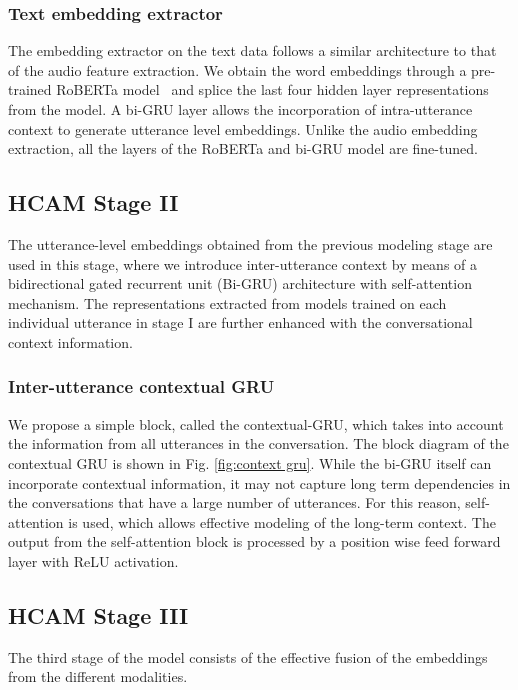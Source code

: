 \documentclass[lettersize,journal]{IEEEtran}
\begin{document}
\subsubsection{Text embedding extractor}\label{textfeat}
The embedding extractor on the text data follows a similar architecture to that of the audio feature extraction. We obtain the word embeddings through a pre-trained RoBERTa model~\cite{liu2019roberta} and splice the last four hidden layer representations from the model. A bi-GRU layer allows the incorporation of intra-utterance context to generate utterance level embeddings.  Unlike the audio embedding  extraction, all the layers of the RoBERTa and bi-GRU model are fine-tuned. 
\subsection{HCAM Stage II}\label{stage2}
The utterance-level embeddings obtained from the previous modeling stage are used in this stage, where we introduce inter-utterance context by means of a bidirectional gated recurrent unit (Bi-GRU) architecture with self-attention mechanism. The representations  extracted from models trained on each individual utterance in stage I are further enhanced with the conversational context information. 
\subsubsection{Inter-utterance contextual GRU}\label{context}

We propose a simple block, called the contextual-GRU, which takes into account the information from all utterances in the conversation.  
The block diagram of the contextual GRU is shown in Fig. \ref{fig:context gru}.  While the bi-GRU itself can incorporate contextual information, it may not capture long term dependencies in the conversations that have a large number of utterances. For this reason, self-attention is used, which allows effective modeling of the long-term context. 
The output from the self-attention block is processed by a position wise feed forward layer with ReLU activation. 
\subsection{HCAM Stage III}\label{stage3}
The third stage of the model consists of the effective fusion of the embeddings from the different modalities. 
\end{document}
